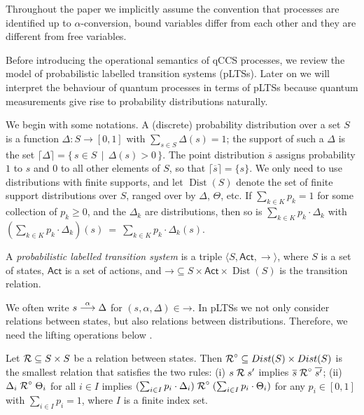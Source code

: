 \documentclass[a4paper,runningheads]{llncs}
\newcommand{\dist}[1]{\mathop{Dist} ({#1})   } %
\newcommand{\pdist}[1]{\overline{#1}  } %
\newcommand{\support}[1]{\lceil{#1}\rceil}
\newcommand{\lift}[1]{\mathrel{{#1}^\circ}}
\newcommand{\Act}{\ensuremath{\mathsf{Act}}\xspace}
\newcommand{\setof}[2]{\{ \, #1 \, \mid \, #2 \, \}}%
\begin{document}
Throughout the paper we implicitly assume the convention that processes are identified up to $\alpha$-conversion, bound variables differ from each other and they are different from free variables.

Before introducing the operational semantics of qCCS processes, we review the model of probabilistic labelled
transition systems (pLTSs). Later on we will interpret the behaviour
of quantum processes in terms of pLTSs because quantum measurements give rise to probability distributions naturally.

We begin with some notations. A (discrete) probability distribution
over a set $S$ is a function $\Delta \colon S \rightarrow [0, 1] $ with
$\sum_{s\in S} \Delta(s) = 1$; the support of such a $\Delta$ is
the set $\support{\Delta} = \setof{s \in S}{\Delta(s) > 0}$.
The point distribution $\pdist{s}$ assigns probability
$1$ to $s$ and $0$ to all other elements of $S$, so that
$\support{\pdist{s}} = \{s\}$. We only need to use distributions with finite supports, and let $\dist{S}$ denote the set of
finite support distributions over $S$, ranged over by $\Delta$, $\Theta$, etc.
If $\sum_{k \in K} p_k = 1$ for some
collection of  $p_k \geq 0$, and the $\Delta_k$ are distributions,
then so is $\sum_{k \in K}p_k \cdot \Delta_k$ with
$(\sum_{k \in K}p_k \cdot \Delta_k)(s)~=~\sum_{k\in K} p_k\cdot \Delta_k(s).$


\begin{definition}\label{def:LTS}
	A \emph{probabilistic labelled transition system}
	is a triple
	$\langle S, \Act,  \rightarrow  \rangle$, where
	$S$ is a set of states,
	$\Act$ is a set of actions, and $\mathord{\rightarrow} \subseteq
	S \times \Act \times \dist{S}$ is the transition relation.
\end{definition}

We often write $s\mathrel{\stackrel{\alpha}{\longrightarrow}}\Delta$ for $(s,\alpha,\Delta)\in\mathord{\rightarrow}$. %
In  pLTSs we not only consider relations between states, but also relations between distributions. Therefore, we need the lifting operations below \cite{Deng15}.
\begin{definition}\label{def:lift}
	Let  $\mathord{\mathrel{{\mathcal R }}} \subseteq
	S\times S$ be a relation between states.
	Then $\mathord{\lift{\aRel}} \subseteq \dist{S} \times
	\dist{S}$ is the smallest relation that satisfies the two rules:
	(i) $s \mathrel{{\mathcal R }} s'$ implies $\pdist{s} \lift{\aRel} \pdist{s'}$;
	(ii) $\Delta_i \lift{\aRel} \Theta_i$ for all $i\in I$ implies
	$(\sum_{i\in I}p_i\cdot\Delta_i)\lift{\aRel}(\sum_{i\in I}p_i\cdot\Theta_i)$
	for any $p_i \in [0,1]$ with $\sum_{i\in I}p_i = 1$, where $I$ is a
	finite index set.
\end{definition}
\end{document}
